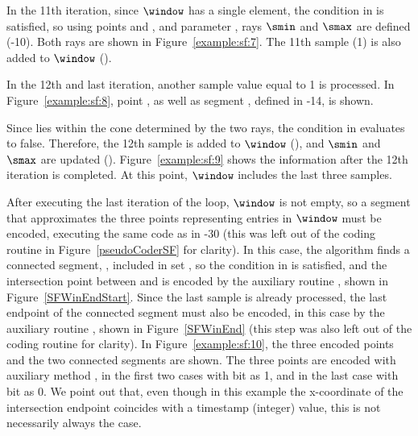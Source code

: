 

\clearpage


In the 11th iteration, since $\window$ has a single element, the condition in  is satisfied, so using points \snapshot and , and parameter \maxerror, rays $\smin$ and $\smax$ are defined (-10). Both rays are shown in Figure~\ref{example:sf:7}. The 11th sample (1) is also added to $\window$ (). 


\vspace{+5pt}


In the 12th and last iteration, another sample value equal to 1 is processed. In Figure~\ref{example:sf:8}, point , as well as segment , defined in -14, is shown.


\vspace{+5pt}


\clearpage


Since  lies within the cone determined by the two rays, the condition in  evaluates to false. Therefore, the 12th sample is added to $\window$ (), and $\smin$ and $\smax$ are updated (). Figure~\ref{example:sf:9}  shows the information after the 12th iteration is completed. At this point, $\window$ includes the last three samples.




After executing the last iteration of the loop, $\window$ is not empty, so a segment that approximates the three points representing entries in $\window$ must be encoded, executing the same code as in -30 (this was left out of the coding routine in Figure~\ref{pseudoCoderSF} for clarity). In this case, the algorithm finds a connected segment, \segmentConnT, included in set \segmentSet, so the condition in  is satisfied, and the intersection point between \segmentLastT and \segmentConnT is encoded by the auxiliary routine \SFEncodeWinEndStart, shown in Figure~\ref{SFWinEndStart}. Since the last sample is already processed, the last endpoint of the connected segment must also be encoded, in this case by the auxiliary routine \CAWinEnd, shown in Figure~\ref{SFWinEnd} (this step was also left out of the coding routine for clarity). In Figure~\ref{example:sf:10}, the three encoded points and the two connected segments are shown. The three points are encoded with auxiliary method \SFEncodePoint, in the first two cases with bit \connectedS as 1, and in the last case with bit \connectedS as 0. We point out that, even though in this example the x-coordinate of the intersection endpoint coincides with a timestamp (integer) value, this is not necessarily always the case.


